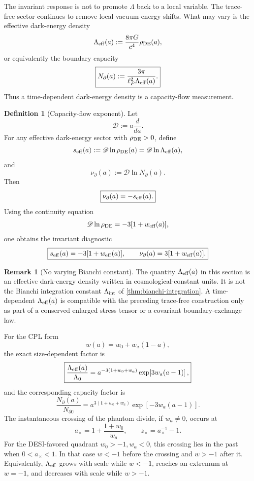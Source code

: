 \documentclass[aps,prd,reprint,nofootinbib,superscriptaddress,floatfix]{revtex4-2}
\numberwithin{equation}{section}
\theoremstyle{definition}
\newtheorem{definition}{Definition}[section]
\newtheorem{remark}{Remark}[section]
\theoremstyle{plain}
\newcommand{\Dil}{\mathscr D}
\begin{document}
The invariant response is not to promote \(\Lambda\) back to a local variable.  The trace-free sector continues to remove local vacuum-energy shifts.  What may vary is the effective dark-energy density
\[
\Lambda_{\rm eff}(a):=\frac{8\pi G}{c^4}\rho_{\rm DE}(a),
\]
or equivalently the boundary capacity
\[
\boxed{
N_\partial(a):=\frac{3\pi}{\ell_P^2\Lambda_{\rm eff}(a)}.
}
\]
Thus a time-dependent dark-energy density is a capacity-flow measurement.

\begin{definition}[Capacity-flow exponent]
Let
\[
\Dil:=a\frac{d}{da}.
\]
For any effective dark-energy sector with \(\rho_{\rm DE}>0\), define
\[
s_{\rm eff}(a):=\Dil\ln\rho_{\rm DE}(a)
=\Dil\ln\Lambda_{\rm eff}(a),
\]
and
\[
\nu_\partial(a):=\Dil\ln N_\partial(a).
\]
Then
\[
\boxed{
\nu_\partial(a)=-s_{\rm eff}(a).
}
\]
Using the continuity equation
\[
\Dil\ln\rho_{\rm DE}=-3[1+w_{\rm eff}(a)],
\]
one obtains the invariant diagnostic
\[
\boxed{
s_{\rm eff}(a)=-3[1+w_{\rm eff}(a)],
\qquad
\nu_\partial(a)=3[1+w_{\rm eff}(a)].
}
\]
\end{definition}

\begin{remark}[No varying Bianchi constant]
The quantity \(\Lambda_{\rm eff}(a)\) in this section is an effective dark-energy density written in cosmological-constant units.  It is not the Bianchi integration constant \(\Lambda_{\rm int}\) of \cref{thm:bianchi-integration}.  A time-dependent \(\Lambda_{\rm eff}(a)\) is compatible with the preceding trace-free construction only as part of a conserved enlarged stress tensor or a covariant boundary-exchange law.
\end{remark}

For the CPL form
\[
w(a)=w_0+w_a(1-a),
\]
the exact size-dependent factor is
\[
\boxed{
\frac{\Lambda_{\rm eff}(a)}{\Lambda_0}
=
a^{-3(1+w_0+w_a)}
\exp\!\left[3w_a(a-1)\right],
}
\]
and the corresponding capacity factor is
\[
\boxed{
\frac{N_\partial(a)}{N_{\partial0}}
=
a^{3(1+w_0+w_a)}
\exp\!\left[-3w_a(a-1)\right].
}
\]
The instantaneous crossing of the phantom divide, if \(w_a\ne0\), occurs at
\[
\boxed{
a_\times=1+\frac{1+w_0}{w_a},
\qquad
z_\times=a_\times^{-1}-1.
}
\]
For the DESI-favored quadrant \(w_0>-1,w_a<0\), this crossing lies in the past when \(0<a_\times<1\).  In that case \(w<-1\) before the crossing and \(w>-1\) after it.  Equivalently, \(\Lambda_{\rm eff}\) grows with scale while \(w<-1\), reaches an extremum at \(w=-1\), and decreases with scale while \(w>-1\).
\end{document}
